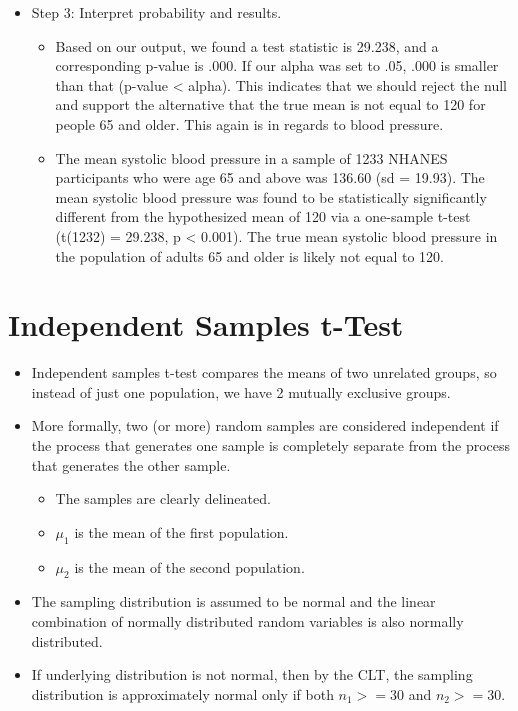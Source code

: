 \documentclass[
  letterpaper,
  DIV=11,
  numbers=noendperiod]{scrreprt}
\providecommand{\tightlist}{%
  \setlength{\itemsep}{0pt}\setlength{\parskip}{0pt}}\usepackage{longtable,booktabs,array}
\begin{document}
\begin{itemize}
\tightlist
\item
  Step 3: Interpret probability and results.

  \begin{itemize}
  \tightlist
  \item
    Based on our output, we found a test statistic is 29.238, and a
    corresponding p-value is .000. If our alpha was set to .05, .000 is
    smaller than that (p-value \textless{} alpha). This indicates that
    we should reject the null and support the alternative that the true
    mean is not equal to 120 for people 65 and older. This again is in
    regards to blood pressure.
  \item
    The mean systolic blood pressure in a sample of 1233 NHANES
    participants who were age 65 and above was 136.60 (sd = 19.93). The
    mean systolic blood pressure was found to be statistically
    significantly different from the hypothesized mean of 120 via a
    one-sample t-test (t(1232) = 29.238, p \textless{} 0.001). The true
    mean systolic blood pressure in the population of adults 65 and
    older is likely not equal to 120.
  \end{itemize}
\end{itemize}

\section{Independent Samples t-Test}\label{independent-samples-t-test}

\begin{itemize}
\tightlist
\item
  Independent samples t-test compares the means of two unrelated groups,
  so instead of just one population, we have 2 mutually exclusive
  groups.
\item
  More formally, two (or more) random samples are considered independent
  if the process that generates one sample is completely separate from
  the process that generates the other sample.

  \begin{itemize}
  \tightlist
  \item
    The samples are clearly delineated.
  \item
    \(\mu_1\) is the mean of the first population.
  \item
    \(\mu_2\) is the mean of the second population.
  \end{itemize}
\item
  The sampling distribution is assumed to be normal and the linear
  combination of normally distributed random variables is also normally
  distributed.
\item
  If underlying distribution is not normal, then by the CLT, the
  sampling distribution is approximately normal only if both
  \(n_1 >= 30\) and \(n_2 >= 30\).
\end{itemize}
\end{document}
